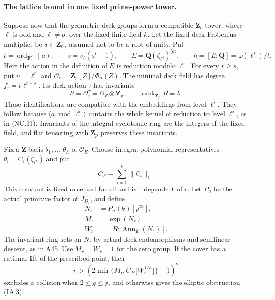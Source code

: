 \documentclass[11pt,a4paper]{article}
\begin{document}
\paragraph{The lattice bound in one fixed prime-power tower.}
Suppose now that the geometric deck groups form a compatible
$\mathbf Z_\ell$ tower, where $\ell$ is odd and $\ell\ne p$, over the
fixed finite field $k$. Let the fixed deck Frobenius multiplier be
$a\in\mathbf Z_\ell^\times$, assumed not to be a root of unity. Put
\[
 t=\operatorname{ord}_{\mathbf F_\ell^\times}(a),\qquad
 s=v_\ell(a^t-1),\qquad
 E=\mathbf Q(\zeta_{\ell^s})^{\langle a\rangle},\qquad
 h=[E:\mathbf Q]=\varphi(\ell^s)/t.
\tag{IA.10}
\]
Here the action in the definition of $E$ is reduction modulo $\ell^s$.
For every $r\ge s$, put $n=\ell^r$ and
$\mathcal O_r=\mathbf Z_p[Z]/\Phi_n(Z)$. The minimal deck field has
degree $f_r=t\ell^{r-s}$. Its deck action $\tau$ has invariants
\[
 R=\mathcal O_r^\tau=\mathcal O_E\otimes\mathbf Z_p,
                      \qquad \operatorname{rank}_{\mathbf Z_p}R=h.
\tag{IA.11}
\]
These identifications are compatible with the embeddings from level
$\ell^s$. They follow because $\langle a\bmod\ell^r\rangle$ contains
the whole kernel of reduction to level $\ell^s$, as in (NC.11).
Invariants of the integral cyclotomic ring are the integers of the
fixed field, and flat tensoring with $\mathbf Z_p$ preserves these
invariants.

Fix a $\mathbf Z$-basis $\theta_1,\ldots,\theta_h$ of $\mathcal O_E$.
Choose integral polynomial representatives
$\theta_i=C_i(\zeta_{\ell^s})$ and put
\[
                         C_E=\sum_{i=1}^h\|C_i\|_1.
\tag{IA.12}
\]
This constant is fixed once and for all and is independent of $r$.
Let $P_n$ be the actual primitive factor of $J_{D_r}$, and define
\[
 \begin{aligned}
 N_r&=P_n(k)[p^\infty],\\
 M_r&=\exp(N_r),\\
 W_r&=[R:\operatorname{Ann}_R(N_r)].
 \end{aligned}
\tag{IA.13}
\]
The invariant ring acts on $N_r$ by actual deck endomorphisms and
semilinear descent, as in A45. Use $M_r=W_r=1$ for the zero group.
If the cover has a rational lift of the prescribed point, then
\[
 n>\left(2\min\{M_r,C_E\lfloor W_r^{1/h}\rfloor\}-1\right)^2
\tag{IA.14}
\]
excludes a collision when $2\le g\le p$, and otherwise gives the
elliptic obstruction (IA.3).
\end{document}
